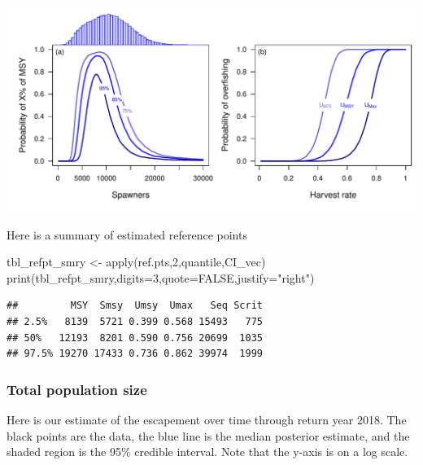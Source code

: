 \documentclass[
  11pt,
]{article}
\newenvironment{Shaded}{}{}
\newcommand{\DataTypeTok}[1]{#1}
\newcommand{\DecValTok}[1]{#1}
\newcommand{\KeywordTok}[1]{\textcolor[rgb]{0.00,0.00,1.00}{#1}}
\newcommand{\NormalTok}[1]{#1}
\newcommand{\OperatorTok}[1]{#1}
\newcommand{\OtherTok}[1]{\textcolor[rgb]{1.00,0.25,0.00}{#1}}
\newcommand{\StringTok}[1]{\textcolor[rgb]{0.00,0.50,0.50}{#1}}
\begin{document}
\begin{Shaded}
\begin{Highlighting}[]
{{     \DataTypeTok{y=}\KeywordTok{par}\NormalTok{()}\OperatorTok{$}\NormalTok{usr[}\DecValTok{4}\NormalTok{]}\OperatorTok{-}\NormalTok{offSet}\OperatorTok{*}\KeywordTok{diff}\NormalTok{(}\KeywordTok{par}\NormalTok{()}\OperatorTok{$}\NormalTok{usr[}\DecValTok{3}\OperatorTok{:}\DecValTok{4}\NormalTok{]),}\StringTok{"(b)"}\NormalTok{)}
\end{Highlighting}
\end{Shaded}

\includegraphics{App_2_Summarize_results_Summer_Fall_Chinook_files/figure-latex/plot_ref_pts-1.pdf}

Here is a summary of estimated reference points

\begin{Shaded}
\begin{Highlighting}[]
\NormalTok{tbl_refpt_smry <-}\StringTok{ }\KeywordTok{apply}\NormalTok{(ref.pts,}\DecValTok{2}\NormalTok{,quantile,CI_vec)}
\KeywordTok{print}\NormalTok{(tbl_refpt_smry,}\DataTypeTok{digits=}\DecValTok{3}\NormalTok{,}\DataTypeTok{quote=}\OtherTok{FALSE}\NormalTok{,}\DataTypeTok{justify=}\StringTok{"right"}\NormalTok{)}
\end{Highlighting}
\end{Shaded}

\begin{verbatim}
##         MSY  Smsy  Umsy  Umax   Seq Scrit
## 2.5%   8139  5721 0.399 0.568 15493   775
## 50%   12193  8201 0.590 0.756 20699  1035
## 97.5% 19270 17433 0.736 0.862 39974  1999
\end{verbatim}

\hypertarget{total-population-size}{%
\subsubsection{Total population size}\label{total-population-size}}

Here is our estimate of the escapement over time through return year
2018. The black points are the data, the blue line is the median
posterior estimate, and the shaded region is the 95\% credible interval.
Note that the y-axis is on a log scale.
\end{document}
